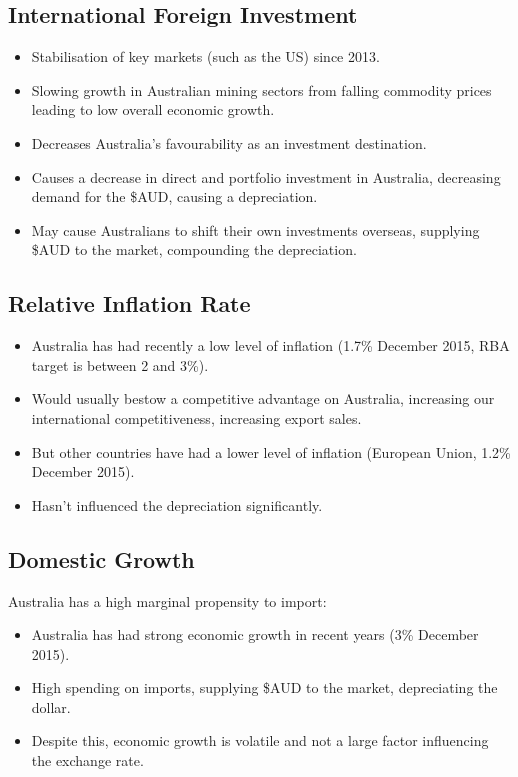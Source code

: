 \documentclass[a4paper,11pt]{article}
\begin{document}
\subsection{International Foreign Investment}

\begin{itemize}
\item Stabilisation of key markets (such as the US) since 2013.
\item Slowing growth in Australian mining sectors from falling commodity prices
	leading to low overall economic growth.
\item Decreases Australia's favourability as an investment destination.
\item Causes a decrease in direct and portfolio investment in Australia,
	decreasing demand for the \$AUD, causing a depreciation.
\item May cause Australians to shift their own investments overseas, supplying
	\$AUD to the market, compounding the depreciation.
\end{itemize}


\subsection{Relative Inflation Rate}

\begin{itemize}
\item Australia has had recently a low level of inflation (1.7\% December 2015,
	RBA target is between 2 and 3\%).
\item Would usually bestow a competitive advantage on Australia, increasing our
	international competitiveness, increasing export sales.
\item But other countries have had a lower level of inflation (European Union,
	1.2\% December 2015).
\item Hasn't influenced the depreciation significantly.
\end{itemize}


\subsection{Domestic Growth}

Australia has a high marginal propensity to import:

\begin{itemize}
\item Australia has had strong economic growth in recent years (3\% December
	2015).
\item High spending on imports, supplying \$AUD to the market, depreciating the
	dollar.
\item Despite this, economic growth is volatile and not a large factor
	influencing the exchange rate.
\end{itemize}
\end{document}
